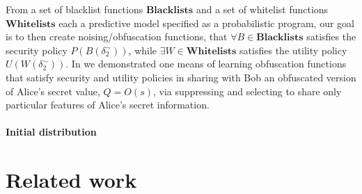 \documentclass{article} %
\newcommand{\pxm}[1]{}
\newcommand{\blacklists}[0]{\textbf{Blacklists}}
\newcommand{\whitelists}[0]{\textbf{Whitelists}}
\theoremstyle{plain} %
\theoremstyle{definition} %
\begin{document}
\pxm{todo: Need to bring out the point that for  having a reasonable
definition of security and utility, it is beneficial to include a
\emph{diverse} set of blacklist and whitelist functions.}


From a set of blacklist functions $\blacklists$ and a set of
whitelist functions $\whitelists$ each a predictive model specified as a probabilistic program, our goal
 is to then create noising/obfuscation functions, that $ \forall B \in \blacklists $ satisfies the security
policy $ P(B(\delta_2^\sim)) $, while $ \exists W \in \whitelists $ satisfies the utility policy $ U(W(\delta_2^\sim)) $.
In \cite{chakraborty12balancing} we demonstrated one means of learning obfuscation functions
that satisfy security and utility policies in sharing with Bob an obfuscated version of Alice's secret value, $ Q = O(s) $, via suppressing and selecting to share only particular features of Alice's secret information.

\paragraph*{Initial distribution}

\pxm{todo: How to soundly determine what an adversary believes to begin
  with. If there is room left.}

\section*{Related work} \pxm{todo: Add some other clear applications
  of probabilistic computing to other information security research,
  if there is room.}





\end{document}
